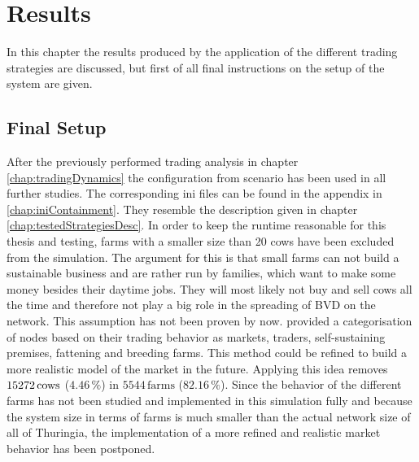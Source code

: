 \chapter{Results}
In this chapter the results produced by the application of the different trading strategies are discussed, but first of all final instructions on the setup of the system are given. 
\section{Final Setup}
After the previously performed trading analysis in chapter \ref{chap:tradingDynamics} the configuration from scenario has been used in all further studies. The corresponding ini files can be found in the appendix in \ref{chap:iniContainment}. They resemble the description given in chapter \ref{chap:testedStrategiesDesc}.  
In order to keep the runtime reasonable for this thesis and testing, farms with a smaller size than 20 cows have been excluded from the simulation. The argument for this is that small farms can not build a sustainable business and are rather run by families, which want to make some money besides their daytime jobs. They will most likely not buy and sell cows all the time and therefore not play a big role in the spreading of BVD on the network. This assumption has not been proven by now. \citep{steinbach16} provided a categorisation of nodes based on their trading behavior as markets, traders, self-sustaining premises, fattening and breeding farms. This method could be refined to build a more realistic model of the market in the future. 
Applying this idea removes $15272\,\text{cows}$ ($4.46\,\%$) in $5544\,\text{farms}$ ($82.16\,\%$).
Since the behavior of the different farms has not been studied and implemented in this simulation fully and because the system size in terms of farms is much smaller than the actual network size of all of Thuringia, the implementation of a more refined and realistic market behavior has been postponed. 
